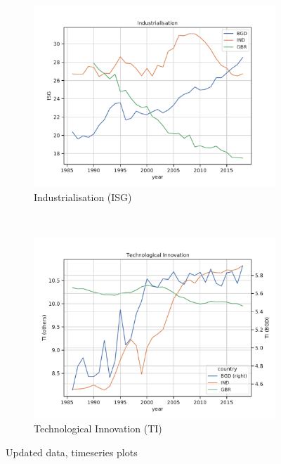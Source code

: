\documentclass[11pt,a4paper]{article}
\begin{document}
\begin{figure}[htbp]\ContinuedFloat
\centering
\begin{subfigure}{0.9\textwidth}
\includegraphics[width=\textwidth]{./plots/ISG_timeseries.pdf}
\caption{Industrialisation (ISG)}
\end{subfigure}\\
\begin{subfigure}{0.9\textwidth}
\includegraphics[width=\textwidth]{./plots/TI_timeseries.pdf}
\caption{Technological Innovation (TI)}
\end{subfigure}
\caption{Updated data, timeseries plots}
\end{figure}
\end{document}
